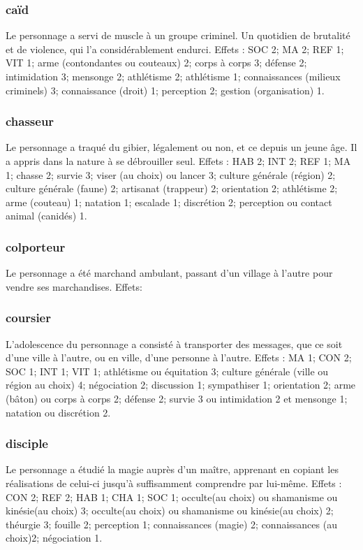 \documentclass[10pt,a4paper,twocolumn]{book}
\begin{document}
\subsubsection{caïd}
Le personnage a servi de muscle à un groupe criminel. Un quotidien de brutalité et de violence, qui l’a considérablement endurci.
Effets : SOC 2; MA 2; REF 1; VIT 1; arme (contondantes ou couteaux) 2; corps à corps 3; défense 2; intimidation 3; mensonge 2; athlétisme 2; athlétisme 1; connaissances (milieux criminels) 3; connaissance (droit) 1; perception 2; gestion (organisation) 1.
\subsubsection{chasseur}
Le personnage a traqué du gibier, légalement ou non, et ce depuis un jeune âge. Il a appris dans la nature à se débrouiller seul.
Effets : HAB 2; INT 2; REF 1; MA 1; chasse 2; survie 3; viser (au choix) ou lancer 3; culture générale (région) 2; culture générale (faune) 2; artisanat (trappeur) 2; orientation 2; athlétisme 2; arme (couteau) 1; natation 1; escalade 1; discrétion 2; perception ou contact animal (canidés) 1.
\subsubsection{colporteur}
Le personnage a été marchand ambulant, passant d’un village à l’autre pour vendre ses marchandises.
Effets: 
\subsubsection{coursier}
L’adolescence du personnage a consisté à transporter des messages, que ce soit d’une ville à l’autre, ou en ville, d’une personne à l’autre.
Effets : MA 1; CON 2; SOC 1; INT 1; VIT 1; athlétisme ou équitation 3; culture générale (ville ou région au choix) 4; négociation 2; discussion 1; sympathiser 1; orientation 2; arme (bâton) ou corps à corps 2; défense 2; survie 3 ou intimidation 2 et mensonge 1; natation ou discrétion 2.
\subsubsection{disciple}
Le personnage a étudié la magie auprès d’un maître, apprenant en copiant les réalisations de celui-ci jusqu’à suffisamment comprendre par lui-même.
Effets : CON 2; REF 2; HAB 1; CHA 1; SOC 1; occulte(au choix) ou shamanisme ou kinésie(au choix) 3; occulte(au choix) ou shamanisme ou kinésie(au choix) 2; théurgie 3; fouille 2; perception 1; connaissances (magie) 2; connaissances (au choix)2; négociation 1.
\end{document}
